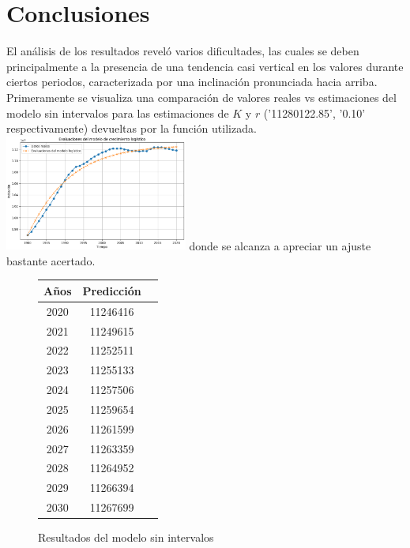 \documentclass[a4paper,10pt,twocolumn]{article}
\begin{document}
\section{Conclusiones}\label{sec:conc}
El análisis de los resultados reveló varios dificultades, las cuales se deben principalmente a la presencia de una tendencia casi vertical en los valores durante ciertos periodos, caracterizada por una inclinación pronunciada hacia arriba.\\
Primeramente se visualiza una comparación de valores reales vs estimaciones del modelo sin intervalos para las estimaciones de $K$ y $r$ ('11280122.85', '0.10' respectivamente) devueltas por la función utilizada.
\includegraphics[width=0.45\textwidth]{img/real_vs_pred.png}
donde se alcanza a apreciar un ajuste bastante acertado.\\ 
\begin{figure}[h!]%
	\begin{center}
		\begin{tabular}{|c|c|c|} \hline
		Años	& Predicción    \\ \hline
		2020 	& 11246416      \\ \hline
		2021 	& 11249615      \\ \hline
		2022 	& 11252511      \\ \hline
		2023 	& 11255133      \\ \hline
		2024 	& 11257506      \\ \hline
		2025 	& 11259654      \\ \hline
		2026 	& 11261599      \\ \hline
		2027 	& 11263359      \\ \hline
		2028 	& 11264952      \\ \hline
		2029 	& 11266394      \\ \hline
		2030 	& 11267699      \\ \hline
		\end{tabular}
	\caption{Resultados del modelo sin intervalos \label{fig:ex}}
\end{center}
\end{figure}
\\
\end{document}
